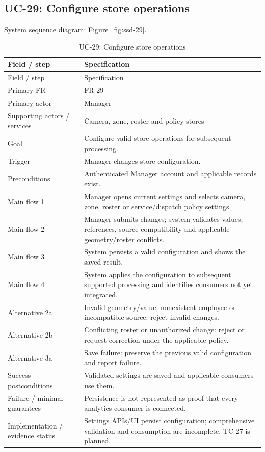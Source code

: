 \subsection*{UC-29: Configure store operations}
\label{uc:29}
System sequence diagram: Figure~\ref{fig:ssd-29}.

\begin{longtable}{P{0.23\textwidth}P{0.67\textwidth}}
\caption{UC-29: Configure store operations}\\
\toprule
Field / step & Specification\\
\midrule
\endfirsthead
\toprule
Field / step & Specification\\
\midrule
\endhead
Primary FR & FR-29\\
Primary actor & Manager\\
Supporting actors / services & Camera, zone, roster and policy stores\\
Goal & Configure valid store operations for subsequent processing.\\
Trigger & Manager changes store configuration.\\
Preconditions & Authenticated Manager account and applicable records exist.\\
Main flow 1 & Manager opens current settings and selects camera, zone, roster or service/dispatch policy settings.\\
Main flow 2 & Manager submits changes; system validates values, references, source compatibility and applicable geometry/roster conflicts.\\
Main flow 3 & System persists a valid configuration and shows the saved result.\\
Main flow 4 & System applies the configuration to subsequent supported processing and identifies consumers not yet integrated.\\
Alternative 2a & Invalid geometry/value, nonexistent employee or incompatible source: reject invalid changes.\\
Alternative 2b & Conflicting roster or unauthorized change: reject or request correction under the applicable policy.\\
Alternative 3a & Save failure: preserve the previous valid configuration and report failure.\\
Success postconditions & Validated settings are saved and applicable consumers use them.\\
Failure / minimal guarantees & Persistence is not represented as proof that every analytics consumer is connected.\\
Implementation / evidence status & Settings APIs/UI persist configuration; comprehensive validation and consumption are incomplete. TC-27 is planned.\\
\bottomrule
\end{longtable}

